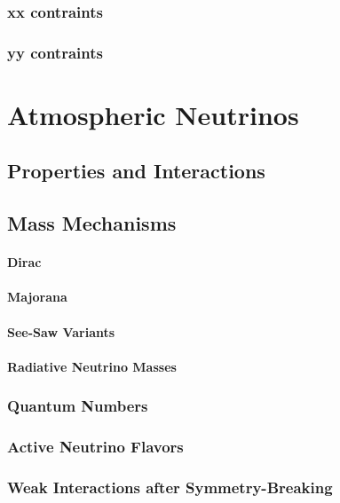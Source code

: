 \subsubsection{xx contraints}

\subsubsection{yy contraints}


\section{Atmospheric Neutrinos}



\subsection{Properties and Interactions}



\subsection{Mass Mechanisms}

\paragraph{Dirac}
\paragraph{Majorana}

\paragraph{See-Saw Variants}

\paragraph{Radiative Neutrino Masses}

\subsubsection{Quantum Numbers}
\subsubsection{Active Neutrino Flavors}

\subsubsection{Weak Interactions after Symmetry-Breaking}

